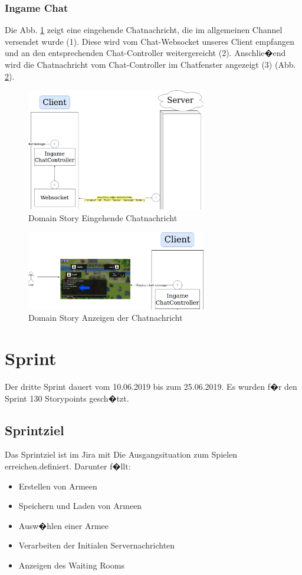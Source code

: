 \documentclass[12pt, titlepage]{scrartcl}
\newcommand{\RN}[1]{%
	\textup{\uppercase\expandafter{\romannumeral#1}}%
}
\begin{document}
		\subsubsection{Ingame Chat}
		Die Abb. \ref{DomainStoryChat1} zeigt eine eingehende Chatnachricht, die im allgemeinen Channel versendet wurde (1). Diese wird vom Chat-Websocket unseres Client empfangen und an den entsprechenden Chat-Controller weitergereicht (2). Anschlie�end wird die Chatnachricht vom Chat-Controller im Chatfenster angezeigt (3) (Abb. \ref{DomainStoryChat2}).
			\begin{figure}[H] 
				\centering
				\includegraphics[width=0.7\textwidth]{Chat1.png}
				\caption{Domain Story Eingehende Chatnachricht}
				\label{DomainStoryChat1}
			\end{figure}
			\begin{figure}[H] 
				\centering
				\includegraphics[width=0.7\textwidth]{Chat2.png}
				\caption{Domain Story Anzeigen der Chatnachricht}
				\label{DomainStoryChat2}
			\end{figure}
	\section{Sprint \RN{3}}
		Der dritte Sprint dauert vom 10.06.2019 bis zum 25.06.2019. Es wurden f�r den Sprint 130 Storypoints gesch�tzt.
		\subsection{Sprintziel}
		Das Sprintziel ist im Jira mit \glqq Die Ausgangsituation zum Spielen erreichen.\grqq definiert. Darunter f�llt:
		\begin{itemize}
			\item Erstellen von Armeen
			\item Speichern und Laden von Armeen
			\item Ausw�hlen einer Armee
			\item Verarbeiten der Initialen Servernachrichten
			\item Anzeigen des Waiting Rooms
		\end{itemize}
\end{document}
